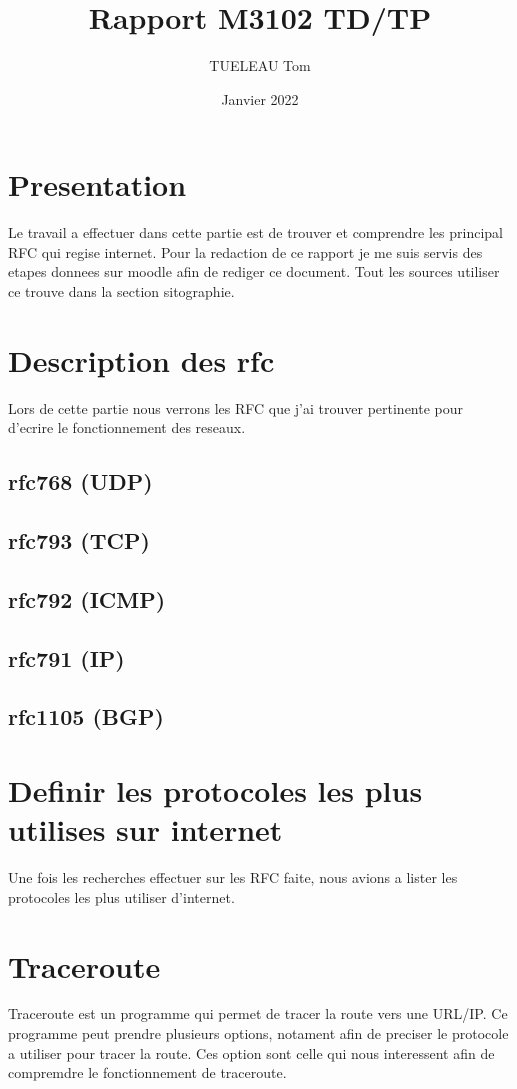 \documentclass[5pt]{article}
\title{Rapport M3102 TD/TP}
\author{TUELEAU Tom}
\date{Janvier 2022}
\begin{document}
    \maketitle    
    \tableofcontents
    \newpage
    \section{Presentation}
    Le travail a effectuer dans cette partie est de trouver et comprendre les principal RFC qui regise internet. Pour la redaction de ce rapport je me suis servis des etapes donnees sur moodle afin de rediger ce document. Tout les sources utiliser ce trouve dans la section sitographie.
    

    \section{Description des rfc}
    Lors de cette partie nous verrons les RFC que j'ai trouver pertinente pour d'ecrire le fonctionnement des reseaux. 
    \subsection{rfc768 (UDP)}
    \subsection{rfc793 (TCP)}
    \subsection{rfc792 (ICMP)}
    \subsection{rfc791 (IP)}
    \subsection{rfc1105 (BGP)}
    
    \section{Definir les protocoles les plus utilises sur internet}
    Une fois les recherches effectuer sur les RFC faite, nous avions a lister les protocoles les plus utiliser d'internet. 
    
    \section{Traceroute}
    Traceroute est un programme qui permet de tracer la route vers une URL/IP. Ce programme peut prendre plusieurs options, notament afin de preciser le protocole a utiliser pour tracer la route. Ces option sont celle qui nous interessent afin de compremdre le fonctionnement de traceroute.
\end{document}
